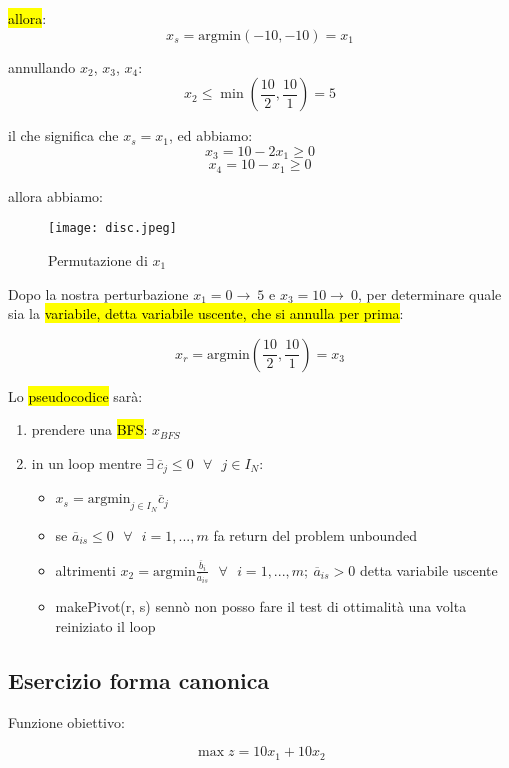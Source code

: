\begin{enumerate}
		\hl{allora}:
		$$x_s = \text{argmin} (-10, -10) = x_1$$

		annullando $x_2$, $x_3$, $x_4$:
		$$x_2 \leq \min (\frac{10}{2}, \frac{10}{1}) = 5$$

		il che significa che $x_s = x_1$, ed abbiamo:
		$$x_3 = 10 - 2x_1 \geq 0$$
		$$x_4 = 10 - x_1 \geq 0$$

		allora abbiamo:


		\begin{figure}[H]
		\centering
		\texttt{[image: disc.jpeg]}
		\caption{Permutazione di $x_1$} 
		\label{disc}
		\end{figure}


		Dopo la nostra perturbazione $x_1 = 0 \to\ 5$ e $x_3 = 10 \to\ 0$, per determinare quale sia la \hl{variabile, detta variabile uscente, che si annulla per prima}:

		$$x_r = \text{argmin} (\frac{10}{2}, \frac{10}{1}) = x_3$$

\end{enumerate}

Lo \hl{pseudocodice} sarà:

\begin{enumerate}
	\item prendere una \hl{BFS}: $x_{BFS}$
	\item in un loop mentre $\exists\ \overline{c}_j \leq 0\ \ \ \forall\ \ \ j \in I_N$:
		\begin{itemize}
			\item $x_s = \text{argmin}_{j \in I_N} \overline{c}_j$
			\item se $\overline{a}_{is} \leq 0\ \ \ \forall\ \ \ i = 1, ..., m$ fa return del problem unbounded
			\item altrimenti $x_2 = \text{argmin} \frac{\overline{b}_i}{\overline{a}_{is}}\ \ \ \forall\ \ \ i = 1, ..., m;\ \overline{a}_{is} > 0$ detta variabile uscente
			\item makePivot(r, s) sennò non posso fare il test di ottimalità una volta reiniziato il loop
		\end{itemize}
\end{enumerate}


\subsection{Esercizio forma canonica}

Funzione obiettivo:

$$\max z = 10x_1 + 10x_2$$

